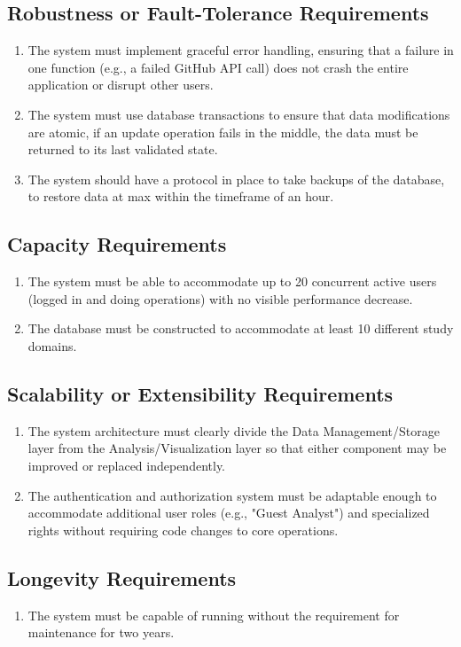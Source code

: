\documentclass[12pt]{article}
\begin{document}
\subsection{Robustness or Fault-Tolerance Requirements}
\begin{enumerate}[label=PR-RFT\arabic*]
  \item The system must implement graceful error handling, ensuring that a failure in one function (e.g., a failed GitHub API call) does not crash the entire application or disrupt other users.
  \item The system must use database transactions to ensure that data modifications are atomic, if an update operation fails in the middle, the data must be returned to its last validated state.
  \item The system should have a protocol in place to take backups of the database, to restore data at max within the timeframe of an hour.
\end{enumerate}
\subsection{Capacity Requirements}
\begin{enumerate}[label=PR-CR\arabic*]
  \item The system must be able to accommodate up to 20 concurrent active users (logged in and doing operations) with no visible performance decrease.
  \item The database must be constructed to accommodate at least 10 different study domains.
\end{enumerate}
\subsection{Scalability or Extensibility Requirements}
\begin{enumerate}[label=PR-SE\arabic*]
  \item The system architecture must clearly divide the Data Management/Storage layer from the Analysis/Visualization layer so that either component may be improved or replaced independently.
  \item The authentication and authorization system must be adaptable enough to accommodate additional user roles (e.g., "Guest Analyst") and specialized rights without requiring code changes to core operations.
\end{enumerate}
\subsection{Longevity Requirements}
\begin{enumerate}[label=PR-LR\arabic*]
  \item The system must be capable of running without the requirement for maintenance for two years. 
\end{enumerate}
\end{document}
